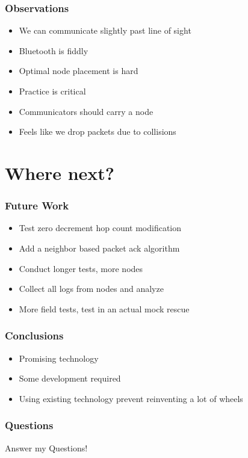 \documentclass{beamer}
\begin{document}
\begin{frame}

\frametitle{Observations}

\begin{itemize}
\item We can communicate slightly past line of sight
\item Bluetooth is fiddly
\item Optimal node placement is hard
\item Practice is critical
\item Communicators should carry a node
\item Feels like we drop packets due to collisions
\end{itemize}

\end{frame}

\section{Where next?}

\begin{frame}
\frametitle{Future Work}

\begin{itemize}
\item Test zero decrement hop count modification
\item Add a neighbor based packet ack algorithm
\item Conduct longer tests, more nodes
\item Collect all logs from nodes and analyze
\item More field tests, test in an actual mock rescue
\end{itemize}

\end{frame}


\begin{frame}
\frametitle{Conclusions}

\begin{itemize}
\item Promising technology
\item Some development required
\item Using existing technology prevent reinventing a lot of wheels
\end{itemize}
\end{frame}

\begin{frame}
\frametitle{Questions}

Answer my Questions!

\end{frame}
\end{document}
